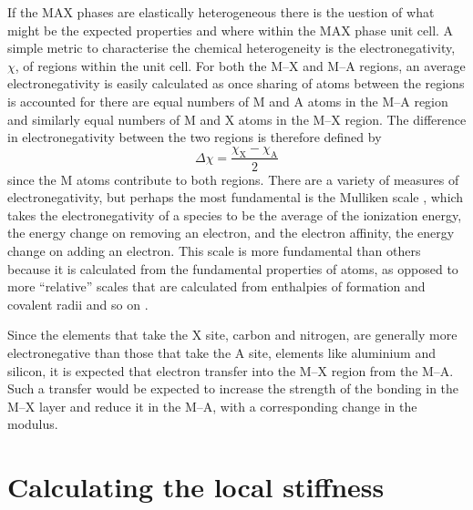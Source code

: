 If the MAX phases are elastically heterogeneous there is the uestion of what might be the expected properties and where within the MAX phase unit cell. A simple metric to characterise the chemical heterogeneity is the electronegativity, $\chi$, of regions within the unit cell. For both the M--X and M--A regions, an average electronegativity is easily calculated as once sharing of atoms between the regions is accounted for there are equal numbers of M and A atoms in the M--A region and similarly equal numbers of M and X atoms in the M--X region. The difference in electronegativity between the two regions is therefore defined by
\begin{equation}
\Delta \chi = \frac{\chi_{\text{X}} - \chi_{\text{A}}}{2}
\end{equation}
since the M atoms contribute to both regions. There are a variety of measures of electronegativity, but perhaps the most fundamental is the Mulliken scale \cite{Mulliken1934}, which takes the electronegativity of a species to be the average of the ionization energy, the energy change on removing an electron, and the electron affinity, the energy change on adding an electron. This scale is more fundamental than others because it is calculated from the fundamental properties of atoms, as opposed to more ``relative'' scales that are calculated from enthalpies of formation and covalent radii and so on \cite{huheey1983ch3_electronegativity}.

Since the elements that take the X site, carbon and nitrogen, are generally more electronegative than those that take the A site, elements like aluminium and silicon, it is expected that electron transfer into the M--X region from the M--A. Such a transfer would be expected to increase the strength of the bonding in the M--X layer and reduce it in the M--A, with a corresponding change in the modulus.

\section{Calculating the local stiffness}

